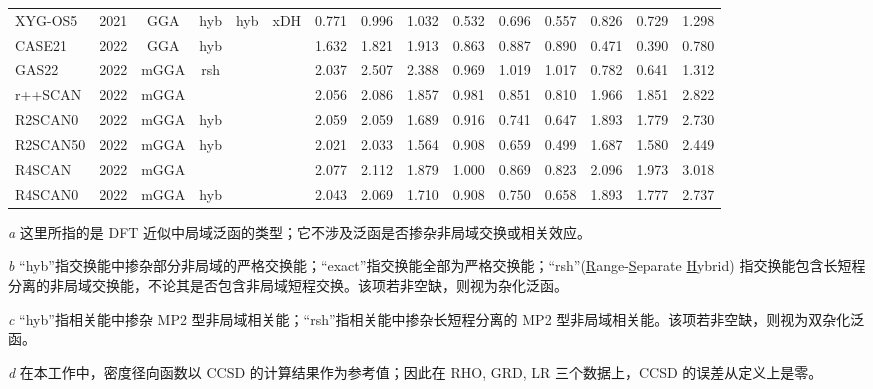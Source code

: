 \begin{landscape}
\begin{longtable}{lcccccrrrrrrrrr}
    XYG-OS5          & 2021 & GGA  & hyb      & hyb         & xDH       & 0.771             & 0.996             & 1.032  & 0.532              & 0.696             & 0.557  & 0.826   & 0.729 & 1.298 \\
    CASE21           & 2022 & GGA  & hyb      &             &           & 1.632             & 1.821             & 1.913  & 0.863              & 0.887             & 0.890  & 0.471   & 0.390 & 0.780 \\
    GAS22            & 2022 & mGGA & rsh      &             &           & 2.037             & 2.507             & 2.388  & 0.969              & 1.019             & 1.017  & 0.782   & 0.641 & 1.312 \\
    r++SCAN          & 2022 & mGGA &          &             &           & 2.056             & 2.086             & 1.857  & 0.981              & 0.851             & 0.810  & 1.966   & 1.851 & 2.822 \\
    R2SCAN0          & 2022 & mGGA & hyb      &             &           & 2.059             & 2.059             & 1.689  & 0.916              & 0.741             & 0.647  & 1.893   & 1.779 & 2.730 \\
    R2SCAN50         & 2022 & mGGA & hyb      &             &           & 2.021             & 2.033             & 1.564  & 0.908              & 0.659             & 0.499  & 1.687   & 1.580 & 2.449 \\
    R4SCAN           & 2022 & mGGA &          &             &           & 2.077             & 2.112             & 1.879  & 1.000              & 0.869             & 0.823  & 2.096   & 1.973 & 3.018 \\
    R4SCAN0          & 2022 & mGGA & hyb      &             &           & 2.043             & 2.069             & 1.710  & 0.908              & 0.750             & 0.658  & 1.893   & 1.777 & 2.737
\end{longtable}
\footnotesize
\vspace{-1em}
\par\noindent\emph{a} 这里所指的是 DFT 近似中局域泛函的类型；它不涉及泛函是否掺杂非局域交换或相关效应。
\par\noindent\emph{b} “hyb”指交换能中掺杂部分非局域的严格交换能；“exact”指交换能全部为严格交换能；“rsh”(\underline{R}ange-\underline{S}eparate \underline{H}ybrid) 指交换能包含长短程分离的非局域交换能，不论其是否包含非局域短程交换。该项若非空缺，则视为杂化泛函。
\par\noindent\emph{c} “hyb”指相关能中掺杂 MP2 型非局域相关能；“rsh”指相关能中掺杂长短程分离的 MP2 型非局域相关能。该项若非空缺，则视为双杂化泛函。
\par\noindent\emph{d} 在本工作中，密度径向函数以 CCSD 的计算结果作为参考值；因此在 RHO, GRD, LR 三个数据上，CCSD 的误差从定义上是零。
\end{landscape}


